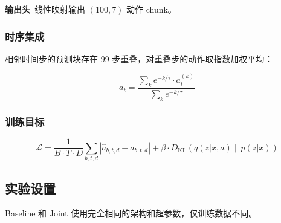 \documentclass[12pt,a4paper]{ctexart}
\begin{document}
\textbf{输出头}\ 线性映射输出 $(100, 7)$ 动作 chunk。

\subsubsection{时序集成}

相邻时间步的预测块存在 99 步重叠，对重叠步的动作取指数加权平均：

\begin{equation}
    a_t = \frac{\sum_{k} e^{-k/\tau} \cdot a_t^{(k)}}{\sum_{k} e^{-k/\tau}}
\end{equation}

\subsubsection{训练目标}

\begin{equation}
    \mathcal{L} = \frac{1}{B \cdot T \cdot D} \sum_{b,t,d} \left| \hat{a}_{b,t,d} - a_{b,t,d} \right| + \beta \cdot D_{\text{KL}}\left(q(z|x,a) \parallel p(z|x)\right)
\end{equation}

\subsection{实验设置}

Baseline 和 Joint 使用完全相同的架构和超参数，仅训练数据不同。
\end{document}
